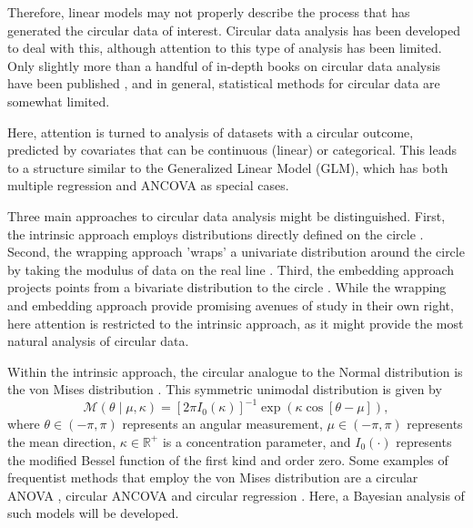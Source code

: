 \documentclass[11pt,a4paper]{article}\usepackage[]{graphicx}\usepackage[]{color}
\begin{document}
Therefore, linear models may not properly describe the process that has generated the circular data of interest. Circular data analysis has been developed to deal with this, although attention to this type of analysis has been limited. Only slightly more than a handful of in-depth books on circular data analysis have been published \citep{fisher1995statistical, mardia1999directional, pewsey2013circular, jammalamadaka2001topics}, and in general, statistical methods for circular data are somewhat limited.

Here, attention is turned to analysis of datasets with a circular outcome, predicted by covariates that can be continuous (linear) or categorical. This leads to a structure similar to the Generalized Linear Model (GLM), which has both multiple regression and ANCOVA as special cases.

Three main approaches to circular data analysis might be distinguished. First, the intrinsic approach employs distributions directly defined on the circle  \citep{fisher1992regression, artes2008hypothesis}. Second, the wrapping approach 'wraps' a univariate distribution around the circle by taking the modulus of data on the real line \citep{ferrari2009wrapping, coles1998inference}. Third, the embedding approach projects points from a bivariate distribution to the circle \citep{nunez2011bayesian, nunez2014bayesian, wang2014modeling, hernandez2015general, maruotti2016analyzing}. While the wrapping and embedding approach provide promising avenues of study in their own right, here attention is restricted to the intrinsic approach, as it might provide the most natural analysis of circular data.

Within the intrinsic approach, the circular analogue to the Normal distribution is the von Mises distribution \citep{von1918ganzzahligkeit}. This symmetric unimodal distribution is given by
\begin{equation}
\mathcal{M}(\theta \mid \mu, \kappa) = \left[ 2 \pi I_0(\kappa) \right]^{-1}
\exp \left( \kappa \cos \left[ \theta - \mu \right] \right),
\end{equation}
where \( \theta \in (-\pi, \pi) \) represents an angular measurement, \( \mu \in (-\pi, \pi) \) represents the mean direction, \( \kappa \in \mathbb{R}^+ \) is a concentration parameter, and \( I_0(\cdot) \) represents the modified Bessel function of the first kind and order zero. Some examples of frequentist methods that employ the von Mises distribution are a circular ANOVA \citep{watson1956construction}, circular ANCOVA \citep{artes2008hypothesis} and circular regression \citep{fisher1992regression}. Here, a Bayesian analysis of such models will be developed.
\end{document}
